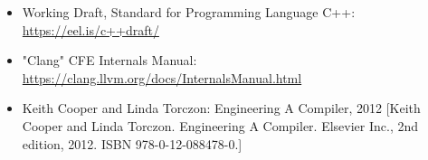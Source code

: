 \begin{itemize}
\item
Working Draft, Standard for Programming Language C++: \url{https://eel.is/c++draft/}

\item
"Clang" CFE Internals Manual: \url{https://clang.llvm.org/docs/InternalsManual.html}

\item
Keith Cooper and Linda Torczon: Engineering A Compiler, 2012 [Keith Cooper and Linda Torczon. Engineering A Compiler. Elsevier Inc., 2nd edition, 2012. ISBN 978-0-12-088478-0.]
\end{itemize}
